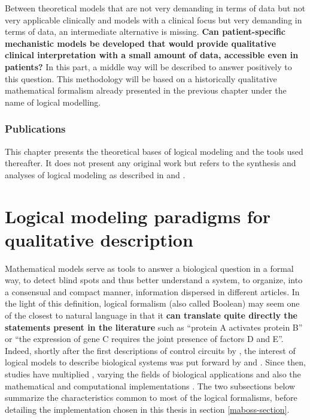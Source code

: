 \documentclass[a4paper,12pt,twoside,onecolumn,openright,final,oldfontcommands]{memoir}
\begin{document}
Between theoretical models that are not very demanding in terms of data
but not very applicable clinically and models with a clinical focus but
very demanding in terms of data, an intermediate alternative is missing.
\textbf{Can patient-specific mechanistic models be developed that would
provide qualitative clinical interpretation with a small amount of data,
accessible even in patients?} In this part, a middle way will be
described to answer positively to this question. This methodology will
be based on a historically qualitative mathematical formalism already
presented in the previous chapter under the name of logical modelling.

\subsubsection*{Publications}\label{publications}

This chapter presents the theoretical bases of logical modeling and the
tools used thereafter. It does not present any original work but refers
to the synthesis and analyses of logical modeling as described in
\citet{beal2019personalization} and \citet{beal2020modelisation}.

\section{Logical modeling paradigms for qualitative
description}\label{logical-modeling-paradigms-for-qualitative-description}

Mathematical models serve as tools to answer a biological question in a
formal way, to detect blind spots and thus better understand a system,
to organize, into a consensual and compact manner, information dispersed
in different articles. In the light of this definition, logical
formalism (also called Boolean) may seem one of the closest to natural
language in that it \textbf{can translate quite directly the statements
present in the literature} such as ``protein A activates protein B'' or
``the expression of gene C requires the joint presence of factors D and
E''. Indeed, shortly after the first descriptions of control circuits by
\citet{jacob1961genetic}, the interest of logical models to describe
biological systems was put forward by \citet{kauffman1969homeostasis}
and \citet{thomas1973boolean}. Since then, studies have multiplied
\citep{thomas1990biological}, varying the fields of biological
applications and also the mathematical and computational implementations
\citep{naldi2018colomoto}. The two subsections below summarize the
characteristics common to most of the logical formalisms, before
detailing the implementation chosen in this thesis in section
\ref{maboss-section}.
\end{document}
